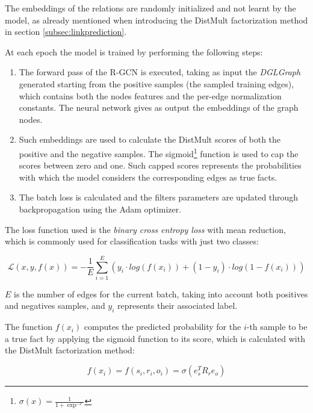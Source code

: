 \documentclass[%
    corpo=13.5pt,
    twoside,
    oldstyle,
    tipotesi=magistrale,
    greek,
    evenboxes
]{toptesi}
\begin{document}
The embeddings of the relations are randomly initialized and not learnt by the
model, as already mentioned when introducing the DistMult factorization
method in section \ref{subsec:linkprediction}.
\newline

At each epoch the model is trained by performing the following steps:

\begin{enumerate}
    \item The forward pass of the R-GCN is executed, taking as input the
        \emph{DGLGraph} generated starting from the positive samples
        (the sampled training edges), which contains both
        the nodes features and the per-edge normalization constants.
        The neural network gives as output the embeddings of the graph nodes.
    \item Such embeddings are used to calculate the DistMult scores
        of both the positive and the negative samples.
        The sigmoid\footnote{
            $\sigma(x) = \frac{1}{1+\exp^{-x}}$
        }
        function is used to cap the scores between zero and one. Such capped
        scores represents the probabilities with which the model considers the
        corresponding edges as true facts.
    \item The batch loss is calculated and the filters parameters are updated
        through backpropagation using the Adam \cite{kingma2014} optimizer.
\end{enumerate}

The loss function used is the \emph{binary cross entropy loss} with mean
reduction, which is commonly used for classification tasks with just two
classes:

\begin{equation}
    \mathcal{L} \left( x, y, f(x) \right) =
        - \frac{1}{E} \sum_{i=1}^{E} \left(
        y_i \cdot log(f(x_i)) +
        (1-y_i) \cdot log(1-f(x_i))
    \right)
\end{equation}

$E$ is the number of edges for the current batch, taking into account both
positives and negatives samples, and $y_i$ represents their associated label.

The function $f(x_i)$ computes the predicted probability for the
$i$-th sample to be a true fact by applying the sigmoid function to its score,
which is calculated with the DistMult factorization method:

\begin{equation}
    f(x_i) = f(s_i,r_i,o_i) = \sigma \left( e_s^T R_r e_o \right)
\end{equation}
\end{document}
